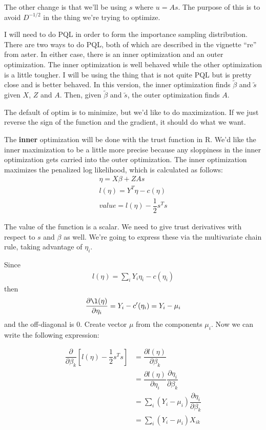 \documentclass{article}
\begin{document}
The other change is that we'll be using $s$ where $u=As$. The purpose of this is to avoid $D^{-1/2}$ in the thing we're trying to optimize.


I will need to do PQL in order to form the importance sampling distribution. There are two ways to do PQL, both of which are described in the  vignette ``re'' from aster. In either case, there is an inner optimization and an outer optimization. The inner optimization is well behaved while the other optimization is a little tougher. I will be using the thing that is not quite PQL but is pretty close and is better behaved.  In this version, the inner optimization finds $\tilde{\beta}$ and $\tilde{s}$ given $X$, $Z$ and $A$. Then, given $\tilde{\beta}$ and $\tilde{s}$, the outer optimization finds $A$.

The default of optim is to minimize, but we'd like to  do maximization. If we just reverse the sign of the function and the gradient, it should do what we want.


The {\bf inner} optimization will be done with the trust function in R. We'd like the inner maximization to be a little more precise because any sloppiness in the inner optimization gets carried into the outer optimization.
The inner optimization maximizes the penalized log likelihood, which is calculated as follows:
\begin{align}
\eta=X\beta +ZAs\\
l(\eta)= Y^T \eta - c(\eta) \\
value= l(\eta)- \dfrac{1}{2} s^Ts
\end{align}

The value of the function is a scalar.  We need to give trust derivatives with respect to $s$ and $\beta$ as well. We're going to express these via the multivariate chain rule, taking advantage of $\eta_i$.

Since
\begin{align}
l(\eta) = \sum_i Y_i \eta_i - c(\eta_i)
\end{align}
then 
\begin{align}
\dfrac{\partial \l(\eta)}{\partial \eta_i} = Y_i-c'(\eta_i) = Y_i -\mu_i
\end{align}
and the off-diagonal is 0. Create  vector $\mu$ from the components $\mu_i$.  Now we can write the following expression:

\begin{align}
\dfrac{\partial}{\partial \beta_k} \left[ l(\eta)-\dfrac{1}{2} s^Ts  \right] &= \dfrac{\partial l(\eta)}{\partial \beta_k}    \\
&= \dfrac{\partial l(\eta)}{\partial \eta_i} \dfrac{\partial \eta_i}{\partial \beta_k}    \\
&=\sum_i (Y_i-\mu_i) \dfrac{\partial \eta_i}{\partial \beta_k} \\
&=\sum_i (Y_i-\mu_i) X_{ik}
\end{align}
\end{document}
